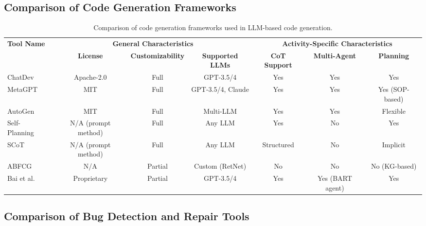 \documentclass[11pt,a4paper]{article}
\begin{document}
\subsection{Comparison of Code Generation Frameworks}

\begin{table}[H]
\centering
\caption{Comparison of code generation frameworks used in LLM-based code generation.}
\label{tab:cmp_generation}
\scriptsize
\begin{tabular}{@{}lcccccc@{}}
\toprule
\multirow{2}{*}{\textbf{Tool Name}} & \multicolumn{3}{c}{\textbf{General Characteristics}} & \multicolumn{3}{c}{\textbf{Activity-Specific Characteristics}} \\
\cmidrule(lr){2-4} \cmidrule(lr){5-7}
 & \textbf{License} & \textbf{Customizability} & \textbf{Supported LLMs} & \textbf{CoT Support} & \textbf{Multi-Agent} & \textbf{Planning} \\
\midrule
ChatDev~\cite{qian2023chatdev} & Apache-2.0 & Full & GPT-3.5/4 & Yes & Yes & Yes \\
MetaGPT~\cite{hong2023metagpt} & MIT & Full & GPT-3.5/4, Claude & Yes & Yes & Yes (SOP-based) \\
AutoGen~\cite{wu2023autogen} & MIT & Full & Multi-LLM & Yes & Yes & Flexible \\
Self-Planning~\cite{jiang2024selfplan} & N/A (prompt method) & Full & Any LLM & Yes & No & Yes \\
SCoT~\cite{li2025scot} & N/A (prompt method) & Full & Any LLM & Structured & No & Implicit \\
ABFCG~\cite{zhang2025abfcg} & N/A & Partial & Custom (RetNet) & No & No & No (KG-based) \\
Bai et al.~\cite{bai2025agent} & Proprietary & Partial & GPT-3.5/4 & Yes & Yes (BART agent) & Yes \\
\bottomrule
\end{tabular}
\end{table}

\subsection{Comparison of Bug Detection and Repair Tools}
\end{document}
